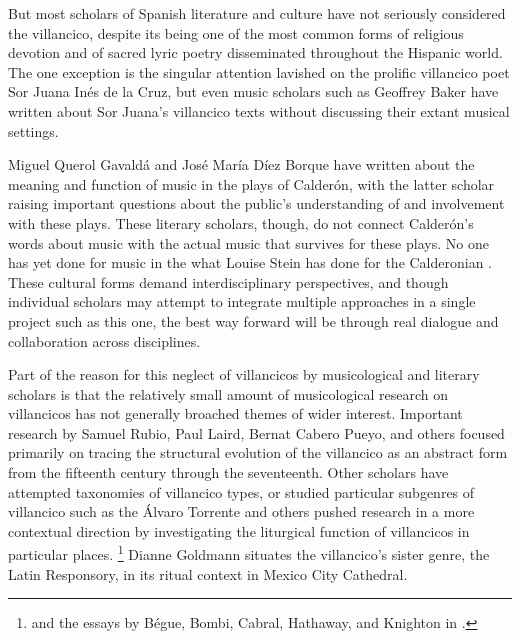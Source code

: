 But most scholars of Spanish literature and culture have not seriously considered the villancico, despite its being one of the most common forms of religious devotion and of sacred lyric poetry disseminated throughout the Hispanic world.
The one exception is the singular attention lavished on the prolific villancico poet Sor Juana Inés de la Cruz, but even music scholars such as Geoffrey Baker have written about Sor Juana's villancico texts without discussing their extant musical settings.%
	\autocites{Tenorio:SorJuana}{Tenorio:Gongorismo}{Baker:EthnicVC}

Miguel Querol Gavaldá and José María Díez Borque have written about the meaning and function of music in the plays of Calderón, with the latter scholar raising important questions about the public's understanding of and involvement with these plays. 
These literary scholars, though, do not connect Calderón's words about music with the actual music that survives for these plays.%
	\autocites{Querol:Calderon}{DiezBorque:Publico}
No one has yet done for music in the  what Louise Stein has done for the Calderonian .%
	\autocite{Stein:Songs}
These cultural forms demand interdisciplinary perspectives, and though individual scholars may attempt to integrate multiple approaches in a single project such as this one, the best way forward will be through real dialogue and collaboration across disciplines.

Part of the reason for this neglect of villancicos by musicological and literary scholars is that the relatively small amount of musicological research on villancicos has not generally broached themes of wider interest.
Important research by Samuel Rubio, Paul Laird, Bernat Cabero Pueyo, and others focused primarily on tracing the structural evolution of the villancico as an abstract form from the fifteenth century through the seventeenth.%
	\autocites{Rubio:Forma}{Laird:VC}{CaberoPueyo:PhD}
Other scholars have attempted taxonomies of villancico types, or studied particular subgenres of villancico such as the 
Álvaro Torrente and others pushed research in a more contextual direction by investigating the liturgical function of villancicos in particular places.%
	\footnote{%
	\autocite{Torrente:PhD} and the essays by Bégue, Bombi, Cabral, Hathaway, and Knighton in \autocite{Knighton-Torrente:VCs}.
	}
Dianne Goldmann situates the villancico's sister genre, the Latin Responsory, in its ritual context in Mexico City Cathedral.
	\autocite{Goldman:Responsory}

